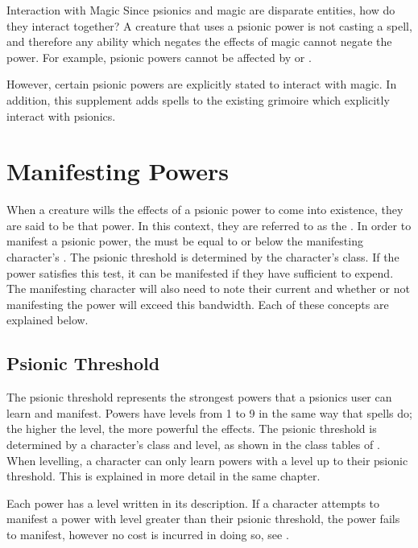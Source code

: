 \begin{DndSidebar}[float=htbp]{Interaction with Magic}
    Since psionics and magic are disparate entities,
    how do they interact together?
    A creature that uses a psionic power is not
    casting a spell,
    and therefore any ability which negates the effects
    of magic cannot negate the power.
    For example, psionic powers cannot be affected by
     or .

    However, certain psionic powers are explicitly stated
    to interact with magic.
    In addition, this supplement adds spells to the existing
    grimoire which explicitly interact with psionics.
\end{DndSidebar}

\section{Manifesting Powers}
\label{sec:manifesting_powers}
When a creature wills the effects of a psionic power
to come into existence,
they are said to be  that power.
In this context,
they are referred to as the .
In order to manifest a psionic power,
the  must be equal to or below
the manifesting character's .
The psionic threshold is determined by the character's class.
If the power satisfies this test,
it can be manifested if they have sufficient 
to expend.
The manifesting character will also need to note their
current  and whether or not manifesting
the power will exceed this bandwidth.
Each of these concepts are explained below.

\subsection{Psionic Threshold}
The psionic threshold represents the strongest powers
that a psionics user can learn and manifest.
Powers have levels from 1 to 9 in the same way that spells do;
the higher the level, the more powerful the effects.
The psionic threshold is determined by a character's class
and level,
as shown in the class tables of .
When levelling,
a character can only learn powers with a level up to
their psionic threshold.
This is explained in more detail in the same chapter.

Each power has a level written in its description.
If a character attempts to manifest a power with level
greater than their psionic threshold,
the power fails to manifest,
however no cost is incurred in doing so,
see .

